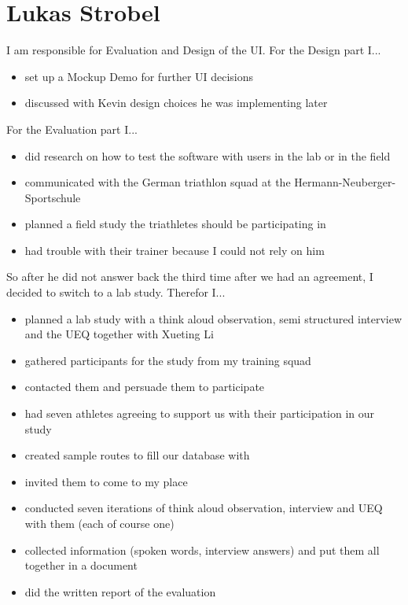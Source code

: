 \documentclass{sigchi}
\begin{document}
\section{Lukas Strobel}
I am responsible for Evaluation and Design of the UI.
For the Design part I...
\begin{itemize}
\item set up a Mockup Demo for further UI decisions
\item discussed with Kevin design choices he was implementing later
\end{itemize}
For the Evaluation part I...
\begin{itemize}
\item did research on how to test the software with users in the lab or in the field
\item communicated with the German triathlon squad at the Hermann-Neuberger-Sportschule
\item planned a field study the triathletes should be participating in
\item had trouble with their trainer because I could not rely on him
\end{itemize}
So after he did not answer back the third time after we had an agreement, I decided to switch to a lab study. Therefor I...
\begin{itemize}
\item planned a lab study with a think aloud observation, semi structured interview and the UEQ together with Xueting Li
\item gathered participants for the study from my training squad
\item contacted them and persuade them to participate
\item had seven athletes agreeing to support us with their participation in our study
\item created sample routes to fill our database with
\item invited them to come to my place
\item conducted seven iterations of think aloud observation, interview and UEQ with them (each of course one)
\item collected information (spoken words, interview answers) and put them all together in a document
\item did the written report of the evaluation 
\end{itemize}
\end{document}
